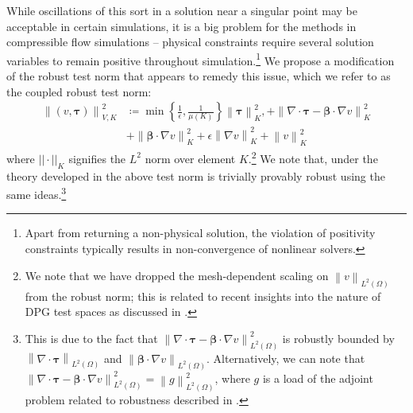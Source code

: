 \documentclass[letterpaper]{article}
\def\btau{\boldsymbol\tau}
\def\bbeta{\boldsymbol\beta}
\newcommand{\norm}[1]{\left\| #1 \right\|}
\newcommand{\LRp}[1]{\left( #1 \right)}
\newcommand{\Grad} {\ensuremath{\nabla}}
\renewcommand{\L}{L^2\LRp{\Omega}}
\newcommand{\grad}{\nabla}
\renewcommand{\div}{\grad \cdot}
\begin{document}
While oscillations of this sort in a solution near a singular point may be
acceptable in certain simulations, it is a big problem for the methods in
compressible flow simulations -- physical constraints require several solution
variables to remain positive throughout simulation.\footnote{Apart from
returning a non-physical solution, the violation of positivity constraints
typically results in non-convergence of nonlinear solvers.}  We propose a
modification of the robust test norm that appears to remedy this issue, which
we refer to as the coupled robust test norm:
\begin{align}
\norm{\LRp{v,\btau}}_{V,K}^2 &\coloneqq
\min\left\{\frac{1}{\epsilon},\frac{1}{\mu(K)}\right\}\norm{\btau}_K^2,
+ \norm{\div \btau - \bbeta\cdot\Grad v}_K^2 \\
&+\norm{\bbeta\cdot \Grad v}_K^2
+ \epsilon\norm{\Grad v}_K^2
+ \norm{v}^2_K
\end{align}
where $||\cdot||_K$ signifies the $L^2$ norm over element $K$.\footnote{
We note that we have dropped the
mesh-dependent scaling on $\norm{v}_{\L}$ from the robust norm; this is related
to recent insights into the nature of DPG test spaces as discussed in
\cite{Chan2013}.
}
We note that, under the
theory developed in \cite{ChanHeuerThanhDemkowicz2012}
the above test norm is
trivially provably robust using the same ideas.\footnote{This is due to the
fact that $\norm{\div \btau - \bbeta\cdot\Grad v}_{\L}^2$ is robustly bounded by
$\norm{\div \btau}_{\L}$ and $\norm{\bbeta\cdot\Grad v}_{\L}$.  Alternatively, we
can note that $\norm{\div \btau - \bbeta\cdot\Grad v}_{\L}^2 = \norm{g}_{\L}^2$,
where $g$ is a load of the adjoint problem related to robustness described in
\cite{ChanHeuerThanhDemkowicz2012}.
}
\end{document}
